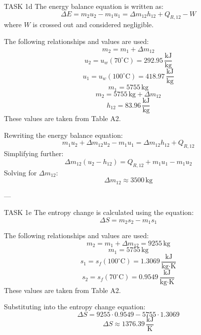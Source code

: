 TASK 1d  
The energy balance equation is written as:  
\[
\Delta E = m_2 u_2 - m_1 u_1 = \Delta m_{12} h_{12} + Q_{R,12} - W
\]  
where \( W \) is crossed out and considered negligible.  

The following relationships and values are used:  
\[
m_2 = m_1 + \Delta m_{12}
\]  
\[
u_2 = u_w(70^\circ\text{C}) = 292.95 \, \frac{\text{kJ}}{\text{kg}}
\]  
\[
u_1 = u_w(100^\circ\text{C}) = 418.97 \, \frac{\text{kJ}}{\text{kg}}
\]  
\[
m_1 = 5755 \, \text{kg}
\]  
\[
m_2 = 5755 \, \text{kg} + \Delta m_{12}
\]  
\[
h_{12} = 83.96 \, \frac{\text{kJ}}{\text{kg}}
\]  
These values are taken from Table A2.  

Rewriting the energy balance equation:  
\[
m_1 u_2 + \Delta m_{12} u_2 - m_1 u_1 = \Delta m_{12} h_{12} + Q_{R,12}
\]  
Simplifying further:  
\[
\Delta m_{12} (u_2 - h_{12}) = Q_{R,12} + m_1 u_1 - m_1 u_2
\]  
Solving for \( \Delta m_{12} \):  
\[
\Delta m_{12} \approx 3500 \, \text{kg}
\]  

---

TASK 1e  
The entropy change is calculated using the equation:  
\[
\Delta S = m_2 s_2 - m_1 s_1
\]  

The following relationships and values are used:  
\[
m_2 = m_1 + \Delta m_{12} = 9255 \, \text{kg}
\]  
\[
m_1 = 5755 \, \text{kg}
\]  
\[
s_1 = s_f(100^\circ\text{C}) = 1.3069 \, \frac{\text{kJ}}{\text{kg·K}}
\]  
\[
s_2 = s_f(70^\circ\text{C}) = 0.9549 \, \frac{\text{kJ}}{\text{kg·K}}
\]  
These values are taken from Table A2.  

Substituting into the entropy change equation:  
\[
\Delta S = 9255 \cdot 0.9549 - 5755 \cdot 1.3069
\]  
\[
\Delta S \approx 1376.39 \, \frac{\text{kJ}}{\text{K}}
\]  